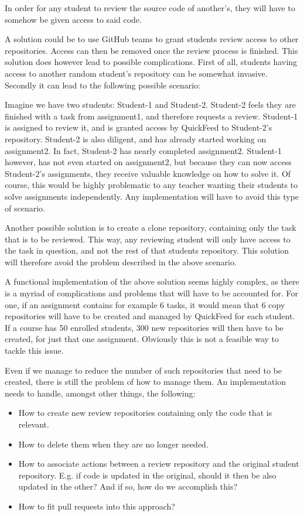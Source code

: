 In order for any student to review the source code of another's, they will have to somehow be given access to said code.

A solution could be to use GitHub teams to grant students review access to other repositories.
Access can then be removed once the review process is finished.
This solution does however lead to possible complications.
First of all, students having access to another random student's repository can be somewhat invasive.
Secondly it can lead to the following possible scenario:

Imagine we have two students: Student-1 and Student-2.
Student-2 feels they are finished with a task from assignment1, and therefore requests a review.
Student-1 is assigned to review it, and is granted access by QuickFeed to Student-2's repository.
Student-2 is also diligent, and has already started working on assignment2.
In fact, Student-2 has nearly completed assignment2.
Student-1 however, has not even started on assignment2, but because they can now access Student-2's assignments, they receive valuable knowledge on how to solve it.
Of course, this would be highly problematic to any teacher wanting their students to solve assignments independently.
Any implementation will have to avoid this type of scenario.

Another possible solution is to create a clone repository, containing only the task that is to be reviewed. 
This way, any reviewing student will only have access to the task in question, and not the rest of that students repository.
This solution will therefore avoid the problem described in the above scenario.

A functional implementation of the above solution seems highly complex, as there is a myriad of complications and problems that will have to be accounted for.
For one, if an assignment contains for example 6 tasks, it would mean that 6 copy repositories will have to be created and managed by QuickFeed for each student.
If a course has 50 enrolled students, 300 new repositories will then have to be created, for just that one assignment.
Obviously this is not a feasible way to tackle this issue.

Even if we manage to reduce the number of such repositories that need to be created, there is still the problem of how to manage them.
An implementation needs to handle, amongst other things, the following:

\begin{itemize}
    \item How to create new review repositories containing only the code that is relevant.
    \item How to delete them when they are no longer needed.
    \item How to associate actions between a review repository and the original student repository.
          E.g. if code is updated in the original, should it then be also updated in the other?
          And if so, how do we accomplish this?
    \item How to fit pull requests into this approach?
\end{itemize}

